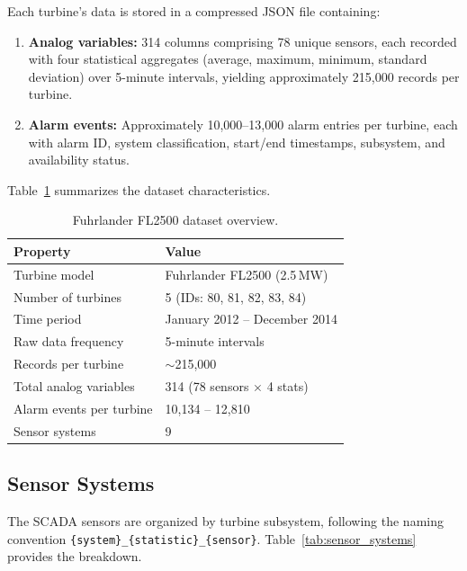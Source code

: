 \documentclass[preprint,12pt]{elsarticle}
\begin{document}
Each turbine's data is stored in a compressed JSON file containing:

\begin{enumerate}
    \item \textbf{Analog variables:} 314 columns comprising 78 unique sensors, each recorded with four statistical aggregates (average, maximum, minimum, standard deviation) over 5-minute intervals, yielding approximately 215,000 records per turbine.
    \item \textbf{Alarm events:} Approximately 10,000--13,000 alarm entries per turbine, each with alarm ID, system classification, start/end timestamps, subsystem, and availability status.
\end{enumerate}

Table~\ref{tab:dataset_overview} summarizes the dataset characteristics.

\begin{table}[H]
\centering
\caption{Fuhrlander FL2500 dataset overview.}
\label{tab:dataset_overview}
\begin{tabular}{ll}
\toprule
Property & Value \\
\midrule
Turbine model & Fuhrlander FL2500 (2.5\,MW) \\
Number of turbines & 5 (IDs: 80, 81, 82, 83, 84) \\
Time period & January 2012 -- December 2014 \\
Raw data frequency & 5-minute intervals \\
Records per turbine & $\sim$215,000 \\
Total analog variables & 314 (78 sensors $\times$ 4 stats) \\
Alarm events per turbine & 10,134 -- 12,810 \\
Sensor systems & 9 \\
\bottomrule
\end{tabular}
\end{table}

\subsection{Sensor Systems}

The SCADA sensors are organized by turbine subsystem, following the naming convention \texttt{\{system\}\_\{statistic\}\_\{sensor\}}. Table~\ref{tab:sensor_systems} provides the breakdown.
\end{document}

